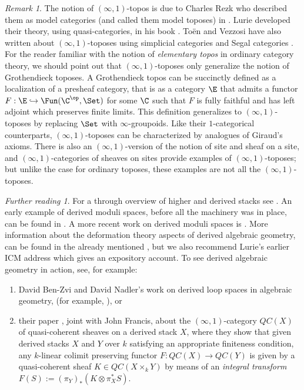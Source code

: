 \documentclass[12pt]{amsart}
\theoremstyle{definition} \newtheorem{definition}[theorem]{Definition}
\theoremstyle{remark} \newtheorem{remark}[theorem]{Remark}
\newtheorem*{further}{Further reading}
\numberwithin{equation}{section}
\newcommand{\oo}{\infty}
\newcommand{\io}{$(\oo,1)$}
\begin{document}
\begin{remark}
  The notion of \io-topos is due to Charles Rezk who described them as
  model categories (and called them model toposes) in
  \cite{RezkTopos}.  Lurie developed their theory, using
  quasi-categories, in his book \cite{HTT}. To\"{e}n and Vezzosi have
  also written about \io-toposes using simplicial categories
  \cite{HAG1} and Segal categories \cite{SegalTopos}. For the reader
  familiar with the notion of \emph{elementary topos} in ordinary
  category theory, we should point out that \io-toposes only
  generalize the notion of Grothendieck toposes.  A Grothendieck topos
  can be succinctly defined as a localization of a presheaf category,
  that is as a category $\E$ that admits a functor $F : \E
  \hookrightarrow \Fun(\C^{\op},\Set)$ for some $\C$ such that $F$ is
  fully faithful and has left adjoint which preserves finite limits.
  This definition generalizes to \io-toposes by replacing $\Set$ with
  $\oo$-groupoids.  Like their $1$-categorical counterparts,
  \io-toposes can be characterized by analogues of Giraud's axioms.
  There is also an \io-version of the notion of site and sheaf on a
  site, and \io-categories of sheaves on sites provide examples of
  \io-toposes; but unlike the case for ordinary toposes, these
  examples are not all the \io-toposes.
\end{remark}

\begin{further}
  For a through overview of higher and derived stacks see
  \cite{ToenHD}. An early example of derived moduli spaces, before all
  the machinery was in place, can be found in \cite{Kontsevich}. A
  more recent work on derived moduli spaces is \cite{HAGDAG}.
  More information about the deformation theory
  aspects of derived algebraic geometry, can be found in the
  already mentioned \cite{DAG10}, but we also recommend Lurie's
  earlier ICM address \cite{LurieICM}
  which gives an expository account. To see derived algebraic
  geometry in action, see, for example:
  \begin{enumerate}
    \item David Ben-Zvi and David Nadler's work on derived loop spaces
      in algebraic geometry, (for example, \cite{BN}), or
    \item their paper \cite{BFN}, joint with John Francis,
      about the \io-category $QC(X)$
      of quasi-coherent sheaves on a derived stack $X$, where they
      show that given derived stacks $X$ and $Y$ over $k$ satisfying
      an appropriate finiteness condition, any $k$-linear
      colimit preserving functor $F : QC(X) \to QC(Y)$ is given by a
      quasi-coherent sheaf $K \in QC(X \times_k Y)$ by means of an
      \emph{integral transform} $F(S) := (\pi_Y)_* (K \otimes \pi_X^*
      S)$.
  \end{enumerate}
\end{further}
\end{document}
